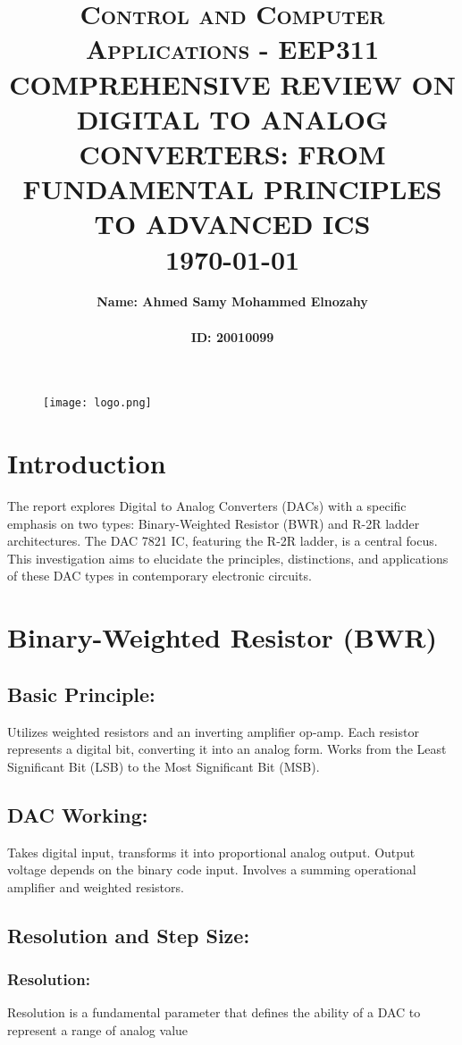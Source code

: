 \documentclass{article}
\title{ \normalsize \textsc{Control and Computer Applications - EEP311}
		\\ [2.0cm]
		\HRule{4pt} 
		\LARGE \textbf{\uppercase{Comprehensive Review on Digital to Analog Converters: From Fundamental Principles to Advanced ICs}}
		\HRule{2pt} \\[0.5cm]
		\normalsize \today \vspace*{5\baselineskip}}
\date{}
\author{
\fontsize{14}{16}\selectfont\textbf{Name: Ahmed Samy Mohammed Elnozahy}\\
\\
		\fontsize{14}{16}\selectfont\textbf{ID: 20010099} \\
  }
\begin{document}
\begin{figure}
    \centering
    \texttt{[image: logo.png]}
\end{figure}
\maketitle



\newpage
\tableofcontents
\newpage
\section{Introduction}
\fontsize{14}{16}\selectfont
The report explores Digital to Analog Converters (DACs) with a specific emphasis on two types: Binary-Weighted Resistor (BWR) and R-2R ladder architectures. The DAC 7821 IC, featuring the R-2R ladder, is a central focus. This investigation aims to elucidate the principles, distinctions, and applications of these DAC types in contemporary electronic circuits.
\section{Binary-Weighted Resistor (BWR)}
\fontsize{14}{16}\selectfont
\subsection{Basic Principle:}

Utilizes weighted resistors and an inverting amplifier op-amp.
Each resistor represents a digital bit, converting it into an analog form.
Works from the Least Significant Bit (LSB) to the Most Significant Bit (MSB).
\subsection{DAC Working:}

Takes digital input, transforms it into proportional analog output.
Output voltage depends on the binary code input.
Involves a summing operational amplifier and weighted resistors.
\subsection{Resolution and Step Size:}

\subsubsection{Resolution:}
Resolution is a fundamental parameter that defines the ability of a DAC to represent a range of analog value
\end{document}
